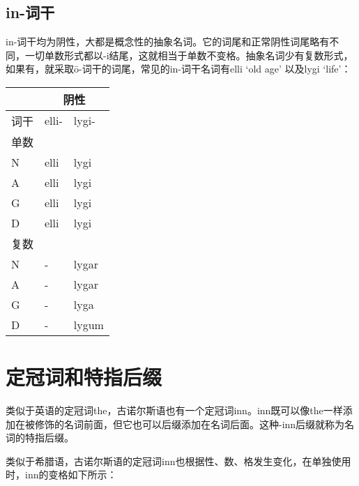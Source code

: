 \subsection{in-词干}
\label{in-词干}

in-词干均为阴性，大都是概念性的抽象名词。它的词尾和正常阴性词尾略有不同，一切单数形式都以-i结尾，这就相当于单数不变格。抽象名词少有复数形式，如果有，就采取ō-词干的词尾，常见的in-词干名词有elli
`old age' 以及lygi `life'：

\begin{longtable}{lll}
  \toprule
       & \multicolumn{2}{c}{\textbf{阴性}}         \\
  \midrule
  \endhead
  \bottomrule
  \endfoot
  词干 & elli-                             & lygi- \\
  单数 &                                   &       \\
  N    & elli                              & lygi  \\
  A    & elli                              & lygi  \\
  G    & elli                              & lygi  \\
  D    & elli                              & lygi  \\
  复数 &                                   &       \\
  N    & -                                 & lygar \\
  A    & -                                 & lygar \\
  G    & -                                 & lyga  \\
  D    & -                                 & lygum \\
\end{longtable}

\section{定冠词和特指后缀}
\label{定冠词和特指后缀}

类似于英语的定冠词the，古诺尔斯语也有一个定冠词inn。inn既可以像the一样添加在被修饰的名词前面，但它也可以后缀添加在名词后面。这种-inn后缀就称为名词的特指后缀。

类似于希腊语，古诺尔斯语的定冠词inn也根据性、数、格发生变化，在单独使用时，inn的变格如下所示：

